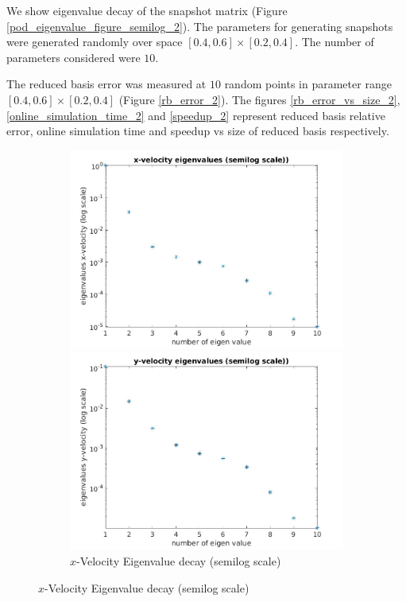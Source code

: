 \documentclass[a4paper,oneside,openright,spanish,english]{book}
\begin{document}
We show eigenvalue decay of the snapshot matrix (Figure \ref{pod_eigenvalue_figure_semilog_2}). The parameters for generating snapshots were generated randomly over space $[0.4,0.6] \times [0.2,0.4]$. The number of parameters considered were $10$. 

The reduced basis error was measured at $10$ random points in parameter range $[0.4,0.6] \times [0.2,0.4]$ (Figure \ref{rb_error_2}). The figures \ref{rb_error_vs_size_2}, \ref{online_simulation_time_2} and \ref{speedup_2} represent reduced basis relative error, online simulation time and speedup vs size of reduced basis respectively.

\begin{figure}
\begin{subfigure}{\textwidth}	
  \includegraphics[width=\linewidth,height=0.3\textheight]{same_train_test/x_velocity_eigen_value_semilog.jpg}
  \caption{$x$-Velocity Eigenvalue decay (semilog scale)} 
  \label{eigen_value_decay_x_velocity_semilog_2}
  \includegraphics[width=\linewidth,height=0.3\textheight]{same_train_test/y_velocity_eigen_value_semilog.jpg}

\end{subfigure}
\end{figure}
\end{document}
